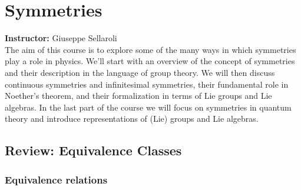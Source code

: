 \documentclass{book}
\theoremstyle{definition}
\begin{document}
\newpage









































\chapter{Symmetries}

\textbf{Instructor:} Giuseppe Sellaroli\\

The aim of this course is to  explore some of the many ways in which symmetries play a role in physics. We'll start with an overview of the concept of symmetries and their description in the language of  group theory. We will then discuss continuous symmetries and infinitesimal symmetries, their fundamental role in Noether's theorem, and their formalization in terms of Lie groups and Lie algebras. In the last part of the course we will focus on symmetries in quantum theory and introduce representations of (Lie) groups and Lie algebras.


\newpage


\section{Review: Equivalence Classes}


\subsection{Equivalence relations}
\end{document}
